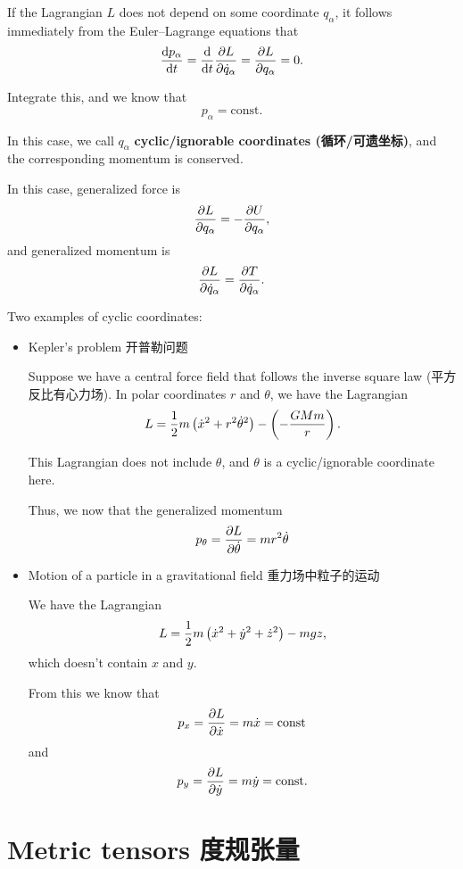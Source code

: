 If the Lagrangian \(L\) does not depend on some coordinate \(q_\alpha\),
it follows immediately from the Euler--Lagrange equations that
\[{\mathrm{d} p_\alpha \over \mathrm{d}t} = {\mathrm{d} \over \mathrm{d}t}{\partial L \over \partial \dot{q}_\alpha} = {\partial L \over \partial q_\alpha} = 0.\]

Integrate this, and we know that \[p_\alpha = \mathrm{const}.\]

In this case, we call \(q_\alpha\) \textbf{cyclic/ignorable coordinates
(循环/可遗坐标)}, and the corresponding momentum is conserved.

In this case, generalized force is
\[{\partial L \over \partial q_\alpha} = - {\partial U \over \partial q_\alpha},\]
and generalized momentum is
\[{\partial L \over \partial \dot{q}_\alpha} = {\partial T \over \partial \dot{q}_\alpha}.\]

Two examples of cyclic coordinates:

\begin{itemize}
\tightlist{}
\item
  Kepler's problem 开普勒问题

  Suppose we have a central force field that follows the inverse square
  law (平方反比有心力场). In polar coordinates \(r\) and \(\theta\), we
  have the Lagrangian
  \[L = {1 \over 2} m \left( \dot{x}^2 + r^2 \dot{\theta}^2 \right) - \left( - {GMm \over r} \right).\]

  This Lagrangian does not include \(\theta\), and \(\theta\) is a
  cyclic/ignorable coordinate here.

  Thus, we now that the generalized momentum
  \[p_\theta = {\partial L \over \partial \dot{\theta}} = mr^2 \dot{\theta}\]
\item
  Motion of a particle in a gravitational field 重力场中粒子的运动

  We have the Lagrangian
  \[L = {1 \over 2} m \left( \dot{x}^2 + \dot{y}^2 + \dot{z}^2 \right) - mgz,\]
  which doesn't contain \(x\) and \(y\).

  From this we know that
  \[p_x = {\partial L \over \partial \dot{x}} = m \dot{x} = \mathrm{const}\]
  and
  \[p_y = {\partial L \over \partial \dot{y}} = m \dot{y} = \mathrm{const}.\]
\end{itemize}

\section{Metric tensors
度规张量}\label{metric-tensors-ux5ea6ux89c4ux5f20ux91cf-2}

